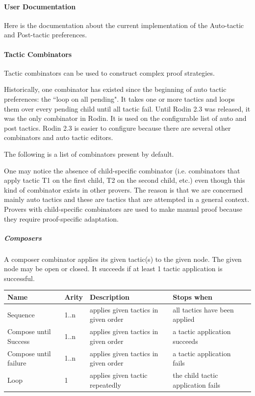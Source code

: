 \paragraph{User Documentation}

Here is the documentation about the current implementation of the Auto-tactic and Post-tactic preferences.

\paragraph{Tactic Combinators}

Tactic combinators can be used to construct complex proof strategies.

Historically, one combinator has existed since the beginning of auto tactic preferences: the ``loop on all pending". It takes one or more tactics and loops them over every pending child until all tactic fail. Until Rodin 2.3 was released, it was the only combinator in Rodin. It is used on the configurable list of auto and post tactics. Rodin 2.3 is easier to configure because there are several other combinators and auto tactic editors.

The following is a list of combinators present by default.

One may notice the absence of child-specific combinator (i.e. combinators that apply tactic T1 on the first child, T2 on the second child, etc.) even though this kind of combinator exists in other provers. The reason is that we are concerned mainly  auto tactics and these are tactics that are attempted in a general context. Provers with child-specific combinators are used to make manual proof because they require proof-specific adaptation.

\subparagraph{Composers}

A composer combinator applies its given tactic(s) to the given node. The given node may be open or closed. It succeeds if at least 1 tactic application is successful. 

\begin{center}
    \begin{tabular}{ | l | l | l | l | p{5cm} |}
    \hline
	Name & Arity & Description & Stops when  \\ \hline
	Sequence & 1..n  & applies given tactics in given order & all tactics have been applied  \\ \hline
	Compose until Success & 1..n  & applies given tactics in given order & a tactic application succeeds \\ \hline
	Compose until failure  & 1..n  & applies given tactics in given order & a tactic application fails \\ \hline
	Loop & 1 & applies given tactic repeatedly & the child tactic application fails \\ \hline
    \end{tabular}
\end{center}

